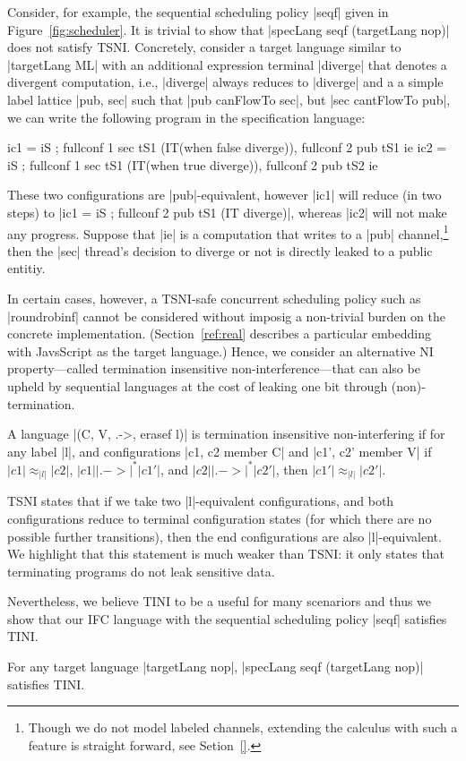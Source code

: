 Consider, for example, the sequential scheduling policy |seqf| given in
Figure~\ref{fig:scheduler}.
%
It is trivial to show that |specLang seqf (targetLang nop)| does not satisfy
TSNI.
%
Concretely, consider a target language similar to |targetLang ML| with an
additional expression terminal |diverge| that denotes a divergent computation,
i.e., |diverge| always reduces to |diverge| and a a simple label lattice |{pub,
sec}| such that |pub canFlowTo sec|, but |sec cantFlowTo pub|, we can write the
following program in the specification language:
\begin{code}
ic1 = iS ; fullconf 1 sec tS1 (IT(when false diverge)),  fullconf 2 pub tS1 ie
ic2 = iS ; fullconf 1 sec tS1 (IT(when true diverge)),   fullconf 2 pub tS2 ie
\end{code}
These two configurations are |pub|-equivalent, however |ic1| will reduce (in two
steps) to |ic1 = iS ; fullconf 2 pub tS1 (IT diverge)|, whereas |ic2| will not make
any progress.
%
Suppose that |ie| is a computation that writes to a |pub| channel,\footnote{
Though we do not model labeled channels, extending the calculus with such a
feature is straight forward, see Setion~\ref{}.
} then the |sec| thread's decision to diverge or not is directly leaked to a
public entitiy.

In certain cases, however, a TSNI-safe concurrent scheduling policy such as
|roundrobinf| cannot be considered without imposig a non-trivial burden on the
concrete implementation.
%
(Section~\ref{ref:real} describes a particular embedding with JavsScript as the
target language.)
%
Hence, we consider an alternative NI property---called termination insensitive
non-interference---that can also be upheld by sequential languages at the cost
of leaking one bit through (non)-termination.
%
\begin{definition}
  A language |(C, V, .->, erasef l)| is termination
  insensitive non-interfering if for any label |l|, and configurations
  |c1, c2 member C| and |c1', c2' member V| if
   $|c1| \approx_{|l|} |c2|$,
   $|c1| |.->|^* |c1'|$, and
   $|c2| |.->|^* |c2'|$, then
   $|c1'| \approx_{|l|} |c2'|$.
\end{definition}

TSNI states that if we take two |l|-equivalent configurations, and both
configurations reduce to terminal configuration states (for which there are no
possible further transitions), then the end configurations are also
|l|-equivalent.
%
We highlight that this statement is much weaker than TSNI: it only states that
terminating programs do not leak sensitive data.
 
Nevertheless, we believe TINI to be a useful for many scenariors and thus we
show that our IFC language with the sequential scheduling policy |seqf|
satisfies TINI.
%
\begin{theorem}
For any target language |targetLang nop|, |specLang seqf (targetLang
nop)| satisfies TINI.
\end{theorem}
